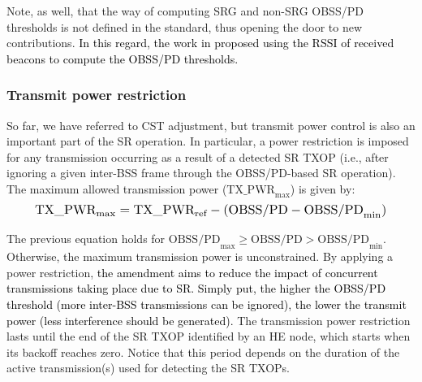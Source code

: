 \documentclass{ieeeaccess}
\begin{document}
Note, as well, that the way of computing SRG and non-SRG OBSS/PD thresholds is not defined in the standard, thus opening the door to new contributions. \textcolor{black}{In this regard, the work in \cite{tgax2016obss_pd_evaluation} proposed using the RSSI of received beacons to compute the OBSS/PD thresholds.}

\subsubsection{Transmit power restriction}	\label{section:tx_power_restriction}
So far, we have referred to CST adjustment, but transmit power control is also an important part of the SR operation. In particular, a power restriction is imposed for any transmission occurring as a result of a detected SR TXOP (i.e., after ignoring a given inter-BSS frame through the OBSS/PD-based SR operation). The maximum allowed transmission power ($\text{TX\_PWR}_{\max}$) is given by:
\begin{equation}
\resizebox{0.9\columnwidth}{!}{%
	$\text{TX\_PWR}_{\max} = \text{TX\_PWR}_{\text{ref}} - (\text{OBSS/PD} -\text{OBSS/PD}_{\min})$}
\label{eq:power_restriction}
\end{equation}

The previous equation holds for $\text{OBSS/PD}_{\max} \geq \text{OBSS/PD} > \text{OBSS/PD}_{\min}$. Otherwise, the maximum transmission power is unconstrained. By applying a power restriction, \textcolor{black}{the amendment aims to reduce the impact of concurrent transmissions taking place due to SR. Simply put, the higher the OBSS/PD threshold (more inter-BSS transmissions can be ignored), the lower the transmit power (less interference should be generated).} The transmission power restriction lasts until the end of the SR TXOP identified by an HE node, which starts when its backoff reaches zero. Notice that this period depends on the duration of the active transmission(s) used for detecting the SR TXOPs. 
\end{document}
